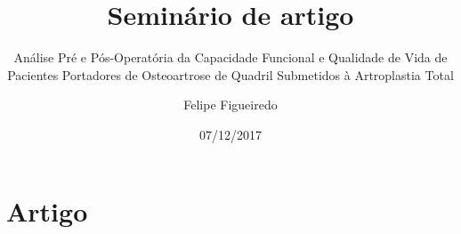 \documentclass{beamer}
\title[Seminário] %
{Seminário de artigo}
\subtitle
{Análise Pré e Pós-Operatória da Capacidade Funcional e Qualidade de Vida de Pacientes Portadores de Osteoartrose de Quadril Submetidos à Artroplastia Total} %
\author%
{Felipe Figueiredo}%
\institute[INTO] %
{Mestrado Profissional em Ciências Aplicadas ao Sistema Musculoesquelético\\
Instituto Nacional de Traumatologia e Ortopedia Jamil Haddad
}
\date%
{07/12/2017}
\begin{document}
\begin{frame}
  \titlepage
\end{frame}









\section{Artigo}
\end{document}
